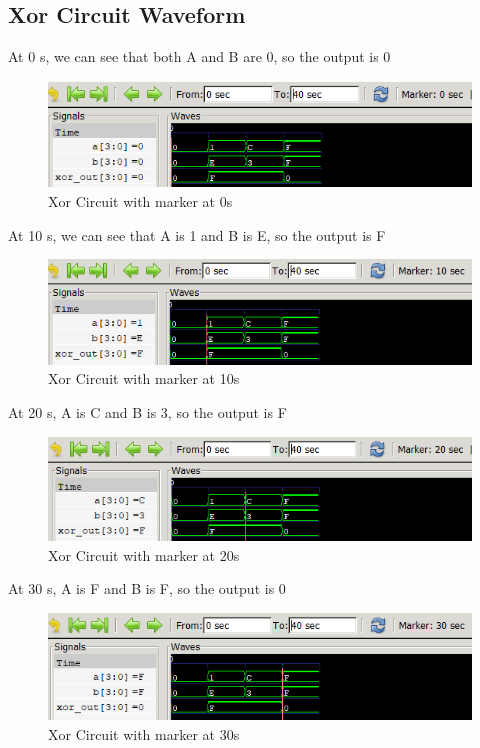 \documentclass[12pt]{article}
\begin{document}
\subsection{Xor Circuit Waveform}

At 0 s, we can see that both A and B are 0, so the output is 0
\begin{figure}[h]
    \centering
    \includegraphics[width = 1.0\textwidth]{figs/Xor0.png}
    \caption{Xor Circuit with marker at 0s}
    \label{fig:enter-label}
\end{figure}

\newpage

At 10 s, we can see that A is 1 and B is E, so the output is F
\begin{figure}[h]
    \centering
    \includegraphics[width = 1.0\textwidth]{figs/Xor10.png}
    \caption{Xor Circuit with marker at 10s}
    \label{fig:enter-label}
\end{figure}

At 20 s, A is C and B is 3, so the output is F
\begin{figure}[h]
    \centering
    \includegraphics[width = 1.0\textwidth]{figs/Xor20.png}
    \caption{Xor Circuit with marker at 20s}
    \label{fig:enter-label}
\end{figure}


At 30 s, A is F and B is F, so the output is 0
\begin{figure}[h]
    \centering
    \includegraphics[width = 1.0\textwidth]{figs/Xor30.png}
    \caption{Xor Circuit with marker at 30s}
    \label{fig:enter-label}
\end{figure}
\end{document}
